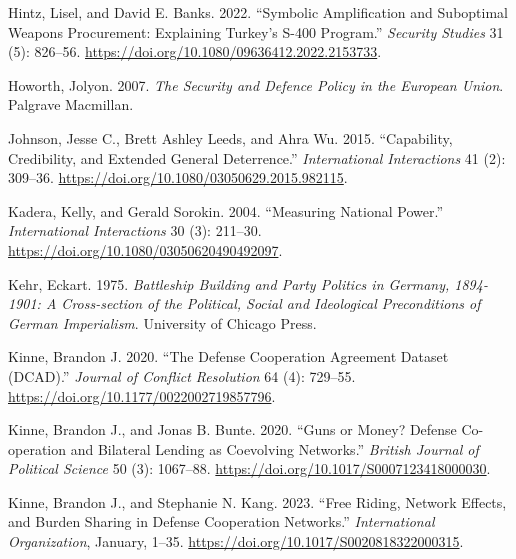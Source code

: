 \documentclass[
  12,
  letterpaper,
  DIV=11,
  numbers=noendperiod]{scrartcl}
\newlength{\cslhangindent}
\newlength{\cslentryspacingunit} %
\newenvironment{CSLReferences}[2] %
 {%
  \setlength{\parindent}{0pt}
  \ifodd #1
  \let\oldpar\par
  \def\par{\hangindent=\cslhangindent\oldpar}
  \fi
  \setlength{\parskip}{#2\cslentryspacingunit}
 }%
 {}
\begin{document}
\begin{CSLReferences}{1}{0}
\leavevmode{}%
Hintz, Lisel, and David E. Banks. 2022. {``Symbolic {Amplification} and
{Suboptimal Weapons Procurement}: {Explaining Turkey}'s {S-400
Program}.''} \emph{Security Studies} 31 (5): 826--56.
\url{https://doi.org/10.1080/09636412.2022.2153733}.

\leavevmode{}%
Howorth, Jolyon. 2007. \emph{The {Security} and {Defence Policy} in the
{European Union}}. {Palgrave Macmillan}.

\leavevmode{}%
Johnson, Jesse C., Brett Ashley Leeds, and Ahra Wu. 2015. {``Capability,
{Credibility}, and {Extended General Deterrence}.''} \emph{International
Interactions} 41 (2): 309--36.
\url{https://doi.org/10.1080/03050629.2015.982115}.

\leavevmode{}%
Kadera, Kelly, and Gerald Sorokin. 2004. {``Measuring {National
Power}.''} \emph{International Interactions} 30 (3): 211--30.
\url{https://doi.org/10.1080/03050620490492097}.

\leavevmode{}%
Kehr, Eckart. 1975. \emph{Battleship {Building} and {Party Politics} in
{Germany}, 1894-1901: {A Cross-section} of the {Political}, {Social} and
{Ideological Preconditions} of {German Imperialism}}. {University of
Chicago Press}.

\leavevmode{}%
Kinne, Brandon J. 2020. {``The {Defense Cooperation Agreement Dataset}
({DCAD}).''} \emph{Journal of Conflict Resolution} 64 (4): 729--55.
\url{https://doi.org/10.1177/0022002719857796}.

\leavevmode{}%
Kinne, Brandon J., and Jonas B. Bunte. 2020. {``Guns or {Money}?
{Defense Co-operation} and {Bilateral Lending} as {Coevolving
Networks}.''} \emph{British Journal of Political Science} 50 (3):
1067--88. \url{https://doi.org/10.1017/S0007123418000030}.

\leavevmode{}%
Kinne, Brandon J., and Stephanie N. Kang. 2023. {``Free {Riding},
{Network Effects}, and {Burden Sharing} in {Defense Cooperation
Networks}.''} \emph{International Organization}, January, 1--35.
\url{https://doi.org/10.1017/S0020818322000315}.


\end{CSLReferences}
\end{document}
